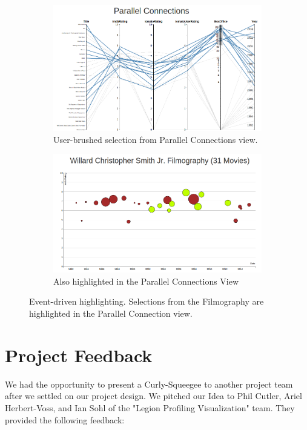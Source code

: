 \documentclass[12pt]{article}
\begin{document}
	\begin{figure}[h!]
		\centering
		\begin{subfigure}[t]{.5\textwidth}
		  \centering
		  \includegraphics[width=\linewidth]{images/pacScrub.png}
		  \caption{User-brushed selection from Parallel Connections view.}
		  \label{fig:ptfha}
		\end{subfigure}%
		\begin{subfigure}[t]{.8\textwidth}
		  \centering
		  \includegraphics[width=.7\linewidth]{images/TimelinePacHighlight.png}
		  \caption{Also highlighted in the Parallel Connections View}
		  \label{fig:ptfhb}
		\end{subfigure}%
		\caption{Event-driven highlighting.  Selections from the Filmography are highlighted in the Parallel Connection view.}
		\label{fig:parallelToFilmHighlight}
	\end{figure}
	
	
\newpage

\section{Project Feedback} \label{sec:Projcet Feedback}

We had the opportunity to present a Curly-Squeegee to another project team after we settled on our project design.   We pitched our Idea to Phil Cutler, Ariel Herbert-Voss, and Ian Sohl of the "Legion Profiling Visualization" team. They provided the following feedback:
\end{document}
